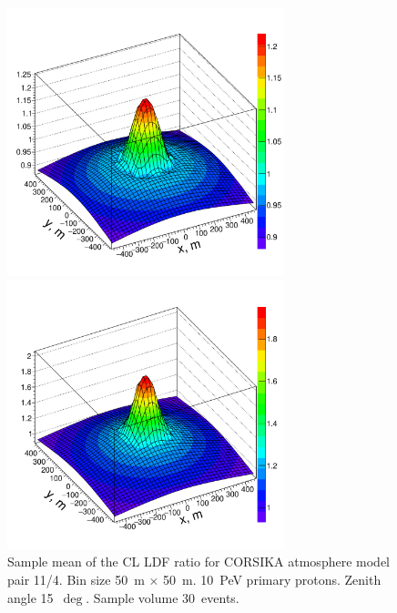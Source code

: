 \documentclass[preprint,5p,times]{elsarticle}
\begin{document}
\begin{figure}[tb]
 \begin{minipage}[t]{0.48\textwidth}
    \centering
    \includegraphics[width=19pc]{10PeV_pro_15deg_m11_over_m04}%
    \vspace{-1.0pc}
    \caption{Sample mean of the CL LDF ratio for CORSIKA atmosphere model pair 11/4. Bin size 50~m $\times$ 50~m. 10~PeV primary protons. Zenith angle 15~$\deg$. Sample volume 30~events.}
\label{fig:4d11}
\end{minipage}
\hfill
\begin{minipage}[t]{0.48\textwidth}
    \centering
    \includegraphics[width=19pc]{10PeV_15deg_pro_over_Fe}%

\end{minipage}
\end{figure}
\end{document}
